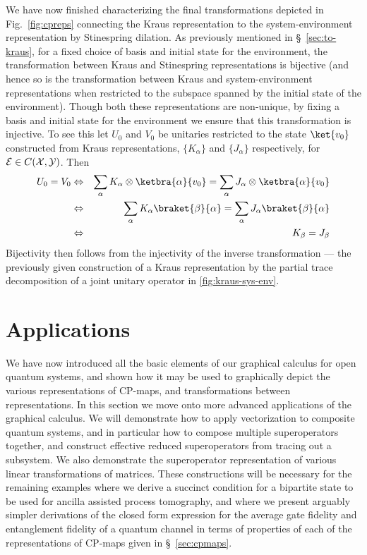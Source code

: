 We have now finished characterizing the final transformations depicted in Fig.~\ref{fig:cpreps} connecting the Kraus representation to the system-environment representation by Stinespring dilation. As previously mentioned in \S~\ref{sec:to-kraus}, for a fixed choice of basis and initial state for the environment, the transformation between Kraus and Stinespring representations is bijective (and hence so is the transformation between Kraus and system-environment representations when restricted to the subspace spanned by the initial state of the environment). Though both these representations are non-unique, by fixing a basis and initial state for the environment we ensure that this transformation is injective. To see this let $U_0$ and $V_0$ be unitaries restricted to the state $\ket{v_0}$ constructed from Kraus representations, $\{K_\alpha\}$ and $\{J_\alpha\}$ respectively, for ${\cal E}\in {C(\mathcal{X,Y})}$. Then 
\begin{eqnarray}
U_0=V_0
&\Leftrightarrow&	\sum_\alpha K_\alpha\otimes\ketbra{\alpha}{v_0} = \sum_\alpha J_\alpha \otimes\ketbra{\alpha}{v_0}\\
&\Leftrightarrow&	\sum_\alpha K_\alpha\braket{\beta}{\alpha} = \sum_\alpha J_\alpha \braket{\beta}{\alpha}\\ 
&\Leftrightarrow& K_\beta = J_\beta
\end{eqnarray}
Bijectivity then follows from the injectivity of the inverse transformation --- the previously given construction of a Kraus representation by the partial trace decomposition of a joint unitary operator in \eqref{fig:kraus-sys-env}. 


\section{Applications}
\label{sec:ex}

We have now introduced all the basic elements of our graphical calculus for open quantum systems, and shown how it may be used to graphically depict the various representations of CP-maps, and transformations between representations. In this section we move onto more advanced applications of the graphical calculus. We will demonstrate how to apply vectorization to composite quantum systems, and in particular how to compose multiple superoperators together, and construct effective reduced superoperators from tracing out a subsystem. We also demonstrate the superoperator representation of various linear transformations of matrices. These constructions will be necessary for the remaining examples where we derive a succinct condition for a bipartite state to be used for ancilla assisted process tomography, and where we present arguably simpler derivations of the closed form expression for the average gate fidelity and entanglement fidelity of a quantum channel in terms of properties of each of the representations of CP-maps given in \S~\ref{sec:cpmaps}.

